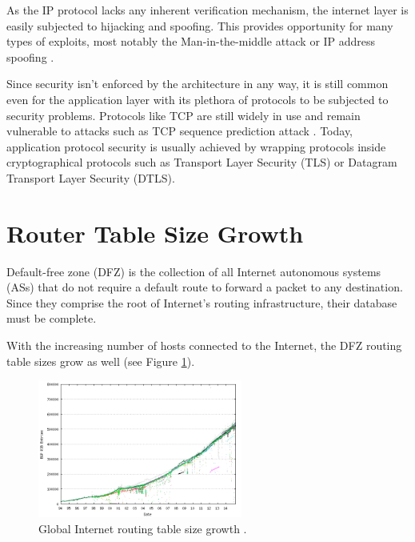         As the IP protocol lacks any inherent verification mechanism, the internet layer is easily subjected to hijacking and spoofing. This provides opportunity for many types of exploits, most notably the Man-in-the-middle attack or IP address spoofing \cite{rfc1948}.

        Since security isn't enforced by the architecture in any way, it is still common even for the application layer with its plethora of protocols to be subjected to security problems. Protocols like TCP are still widely in use and remain vulnerable to attacks such as TCP sequence prediction attack \cite{rfc1948}. Today, application protocol security is usually achieved by wrapping protocols inside cryptographical protocols such as Transport Layer Security (TLS) or Datagram Transport Layer Security (DTLS).

    \section{Router Table Size Growth}

        Default-free zone (DFZ) is the collection of all Internet autonomous systems (ASs) that do not require a default route to forward a packet to any destination. Since they comprise the root of Internet's routing infrastructure, their database must be complete.

        With the increasing number of hosts connected to the Internet, the DFZ routing table sizes grow as well (see Figure \ref{fig:bgp-growth}).

        \begin{figure}[H]
            \begin{center}
                \includegraphics[width=0.6\textwidth]{fig/problems_bgp-growth.png}
              \caption{Global Internet routing table size growth \cite{bgpgrow}.}
              \label{fig:bgp-growth}
            \end{center}
        \end{figure}

